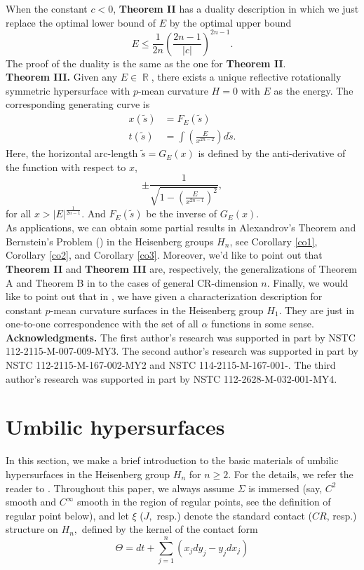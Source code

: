 \documentclass[12pt]{amsart}
\theoremstyle{definition}\newtheorem{exa}[thm]{\sc Example}
\theoremstyle{definition}\newtheorem{de}[thm]{\sc Definition}
\theoremstyle{definition}\newtheorem{rem}[thm]{\sc Remark}
\theoremstyle{definition}\newtheorem{prob}[thm]{\it Problem}
\theoremstyle{definition}\newtheorem{fact}[thm]{\sc Fact}
\theoremstyle{definition}\newtheorem{claim}[thm]{\sc Claim}
\numberwithin{equation}{section}
\DeclareMathOperator{\R}{\mathbb R}
\begin{document}
When the constant $c<0$, {\bf Theorem II} has a duality description in which we just replace the optimal lower bound of $E$ by the optimal upper bound
\[E\leq \frac{1}{2n}\left(\frac{2n-1}{|c|}\right)^{2n-1}.\]
The proof of the duality is the same as the one for {\bf Theorem II}.\\
 
{\bf Theorem III.}
Given any $E\in\R$, there exists a unique reflective rotationally symmetric hypersurface with $p$-mean curvature $H=0$ with $E$ as the energy. The corresponding generating curve is
\begin{equation}
\begin{split}
x(\tilde{s})&=F_{E}(\tilde{s})\\
t(\tilde{s})&=\int \left(\frac{E}{x^{2n-2}}\right) d\tilde{s}.
\end{split}
\end{equation}
Here, the horizontal arc-length $\tilde{s}=G_{E}(x)$ is defined by the anti-derivative of the function with respect to $x$, 
\[\pm \frac{1}{\sqrt{1-\left(\frac{E}{x^{2n-1}}\right)^{2}}},\]
for all $x>|E|^{\frac{1}{2n-1}}$. And $F_{E}(\tilde{s})$ be the inverse of $G_{E}(x)$.\\

As applications, we can obtain some partial results in Alexandrov's Theorem and Bernstein's Problem (\cite{ACV,CHMY,DGNP,DGNP1}) in the Heisenberg groups $H_{n}$, see Corollary \ref{co1}, Corollary \ref{co2}, and Corollary \ref{co3}.  Moreover, we'd like to point out that {\bf Theorem II} and {\bf Theorem III} are, respectively, the generalizations of Theorem A and Theorem B in \cite{CLL} to the cases of general CR-dimension $n$. Finally, we would like to point out that in \cite{CLiu}, we have given a characterization description for constant $p$-mean curvature surfaces in the Heisenberg group $H_{1}$. They are just in one-to-one correspondence with the set of all $\alpha$ functions in some sense.\\


{\bf Acknowledgments.} The first author's research was supported in part by NSTC 112-2115-M-007-009-MY3. The second author's research was supported in part by NSTC 112-2115-M-167-002-MY2 and NSTC 114-2115-M-167-001-. The third author's research was supported in part by NSTC 112-2628-M-032-001-MY4.

\section{Umbilic hypersurfaces}\label{umhys}
In this section, we make a brief introduction to the basic materials of umbilic hypersurfaces in the Heisenberg group $H_{n}$ for $n\geq 2$. For the details, we refer the reader to \cite{CCHY1,CCHY2}.
Throughout this paper, we always assume $\Sigma $ is immersed
(say, $C^{2}$ smooth and $C^{\infty }$ smooth in the region of regular
points, see the definition of regular point below), and let $\xi $
($J,$ resp.) denote the standard contact ($CR$, resp.) structure on $H_{n},$
defined by the kernel of the contact form
\begin{equation*}
\Theta =dt+\sum_{j=1}^{n}(x_{j}dy_{j}-y_{j}dx_{j})
\end{equation*}
\end{document}
